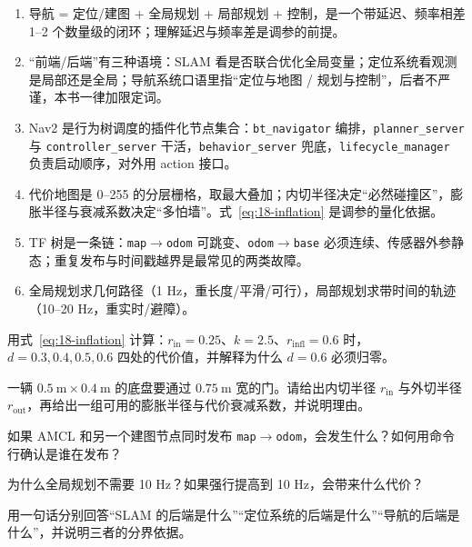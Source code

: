 \begin{summary}

\begin{enumerate}
  \item 导航 = 定位/建图 + 全局规划 + 局部规划 + 控制，是一个带延迟、频率相差 1--2 个数量级的闭环；理解延迟与频率差是调参的前提。
  \item “前端/后端”有三种语境：SLAM 看是否联合优化全局变量；定位系统看观测是局部还是全局；导航系统口语里指“定位与地图 / 规划与控制”，后者不严谨，本书一律加限定词。
  \item Nav2 是行为树调度的插件化节点集合：\texttt{bt\_navigator} 编排，\texttt{planner\_server} 与 \texttt{controller\_server} 干活，\texttt{behavior\_server} 兜底，\texttt{lifecycle\_manager} 负责启动顺序，对外用 action 接口。
  \item 代价地图是 0--255 的分层栅格，取最大叠加；内切半径决定“必然碰撞区”，膨胀半径与衰减系数决定“多怕墙”。式~\eqref{eq:18-inflation} 是调参的量化依据。
  \item TF 树是一条链：\texttt{map}$\to$\texttt{odom} 可跳变、\texttt{odom}$\to$\texttt{base} 必须连续、传感器外参静态；重复发布与时间戳越界是最常见的两类故障。
  \item 全局规划求几何路径（1 Hz，重长度/平滑/可行），局部规划求带时间的轨迹（10--20 Hz，重实时/避障）。
\end{enumerate}


\end{summary}

\begin{problemset}

  \item 用式~\eqref{eq:18-inflation} 计算：$r_{\mathrm{in}}=0.25$、$k=2.5$、$r_{\mathrm{infl}}=0.6$ 时，$d=0.3,0.4,0.5,0.6$ 四处的代价值，并解释为什么 $d=0.6$ 必须归零。
  \item 一辆 $0.5\ \mathrm{m}\times0.4\ \mathrm{m}$ 的底盘要通过 $0.75\ \mathrm{m}$ 宽的门。请给出内切半径 $r_{\mathrm{in}}$ 与外切半径 $r_{\mathrm{out}}$，再给出一组可用的膨胀半径与代价衰减系数，并说明理由。
  \item 如果 AMCL 和另一个建图节点同时发布 \texttt{map}$\to$\texttt{odom}，会发生什么？如何用命令行确认是谁在发布？
  \item 为什么全局规划不需要 10 Hz？如果强行提高到 10 Hz，会带来什么代价？
  \item 用一句话分别回答“SLAM 的后端是什么”“定位系统的后端是什么”“导航的后端是什么”，并说明三者的分界依据。
\end{problemset}

